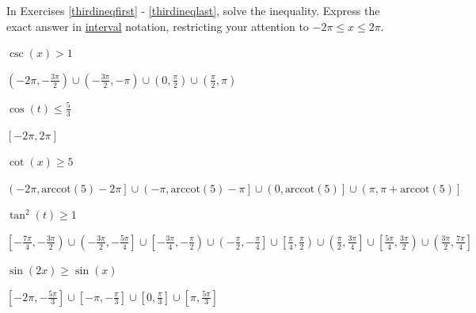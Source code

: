 \documentclass{ximera}
\begin{document}
\begin{question}
In Exercises \ref{thirdineqfirst} - \ref{thirdineqlast}, solve the inequality.  Express the exact answer in \underline{interval} notation, restricting your attention to $-2\pi \leq x \leq 2\pi$.

\begin{problem} \label{thirdineqfirst}
$\csc \left( x \right) > 1$ 

\begin{solution}
$\left( -2\pi, -\frac{3\pi}{2} \right) \cup \left( -\frac{3\pi}{2}, -\pi \right) \cup \left( 0, \frac{\pi}{2} \right) \cup \left( \frac{\pi}{2}, \pi \right)$
\end{solution}
\end{problem}

\begin{problem}
$\cos(t) \leq \frac{5}{3}$

\begin{solution}
$[-2\pi, 2\pi]$
\end{solution}
\end{problem}

\begin{problem}
$\cot(x) \geq 5$

\begin{solution}
$\left(-2\pi, \text{arccot}(5) - 2\pi\right] \cup \left(-\pi, \text{arccot}(5) - \pi\right] \cup \left(0, \text{arccot}(5)\right] \cup \left(\pi, \pi + \text{arccot}(5)\right]$
\end{solution}
\end{problem}

\begin{problem}
$\tan^{2} \left( t \right) \geq 1$

\begin{solution}
$\left[ -\frac{7\pi}{4}, -\frac{3\pi}{2} \right) \cup \left( -\frac{3\pi}{2}, -\frac{5\pi}{4} \right] \cup \left[ -\frac{3\pi}{4}, -\frac{\pi}{2} \right) \cup \left( -\frac{\pi}{2}, -\frac{\pi}{4} \right] \cup \left[ \frac{\pi}{4}, \frac{\pi}{2} \right) \cup \left( \frac{\pi}{2}, \frac{3\pi}{4} \right] \cup \left[ \frac{5\pi}{4}, \frac{3\pi}{2} \right) \cup \left( \frac{3\pi}{2}, \frac{7\pi}{4} \right]$
\end{solution}
\end{problem}

\begin{problem}
$\sin(2x) \geq \sin(x)$

\begin{solution}
$\left[ -2\pi, -\frac{5\pi}{3} \right] \cup \left[ -\pi, -\frac{\pi}{3} \right] \cup \left[ 0, \frac{\pi}{3} \right] \cup \left[ \pi, \frac{5\pi}{3} \right]$
\end{solution}
\end{problem}


\end{question}
\end{document}
